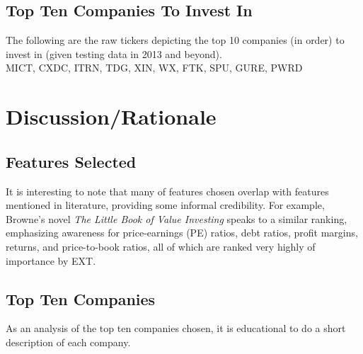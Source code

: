 \documentclass[preprint,12pt]{elsarticle}
\begin{document}
\subsection{Top Ten Companies To Invest In}
The following are the raw tickers depicting the top 10 companies (in order) to invest in (given testing data in 2013 and beyond).\\

MICT, CXDC, ITRN, TDG, XIN, WX, FTK, SPU, GURE, PWRD

\section{Discussion/Rationale}
\label{S:4}

\subsection{Features Selected}
It is interesting to note that many of features chosen overlap with features mentioned in literature, providing some informal credibility. For example, Browne's novel \textit{The Little Book of Value Investing} speaks to a similar ranking, emphasizing awareness for price-earnings (PE) ratios, debt ratios, profit margins, returns, and price-to-book ratios, all of which are ranked very highly of importance by EXT.

\subsection{Top Ten Companies}
As an analysis of the top ten companies chosen, it is educational to do a short description of each company.
\end{document}
